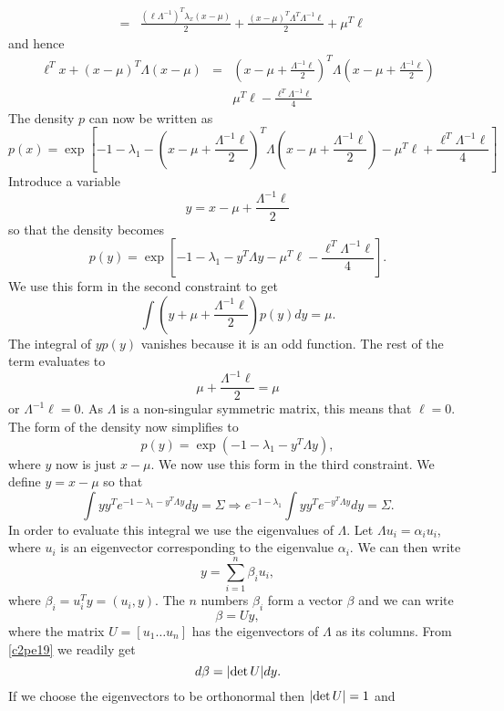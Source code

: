 \begin{enumerate}
\begin{eqnarray*}
 &=& \frac{(\ell\Lambda^{-1})^T\lambda_x(x - \mu)}{2} + \frac{(x - \mu)^T\Lambda^T\Lambda^{-1}\ell}{2} + \mu^T\ell
\end{eqnarray*}
and hence
\begin{eqnarray*}
\ell^Tx + (x-\mu)^T\Lambda(x-\mu) &=& \left(x-\mu+\frac{\Lambda^{-1}\ell}{2}\right)^T\Lambda\left(x-\mu+\frac{\Lambda^{-1}\ell}{2}\right) \\
 & & \mu^T\ell - \frac{\ell^T\Lambda^{-1}\ell}{4}
\end{eqnarray*}
The density $p$ can now be written as
\[
p(x)=\exp\left[-1-\lambda_1 - \left(x-\mu+\frac{\Lambda^{-1}\ell}{2}\right)^T\Lambda\left(x-\mu+\frac{\Lambda^{-1}\ell}{2}\right)-\mu^T\ell+\frac{\ell^T\Lambda^{-1}\ell}{4}\right]
\]
Introduce a variable 
\[
y = x - \mu + \frac{\Lambda^{-1}\ell}{2}
\]
so that the density becomes
\[
p(y) = \exp\left[-1-\lambda_1-y^T\Lambda y - \mu^T\ell - \frac{\ell^T\Lambda^{-1}\ell}{4}\right].
\]
We use this form in the second constraint to get
\[
\int\left(y + \mu + \frac{\Lambda^{-1}\ell}{2}\right)p(y)dy = \mu.
\]
The integral of $yp(y)$ vanishes because it is an odd function. The rest of the term evaluates to
\[
\mu + \frac{\Lambda^{-1}\ell}{2} = \mu
\]
or $\Lambda^{-1}\ell = 0$. As $\Lambda$ is a non-singular symmetric matrix, this means that $\ell = 0$.
The form of the density now simplifies to
\[
p(y) = \exp\left(-1 - \lambda_1 - y^T\Lambda y\right),
\]
where $y$ now is just $x - \mu$. We now use this form in the third constraint. We define 
$y = x - \mu$ so that
\begin{equation}\label{c2pe18}
\int yy^Te^{-1 - \lambda_1 - y^T\Lambda y}dy = \Sigma \Rightarrow e^{-1-\lambda_1} \int yy^T e^{-y^T\Lambda y}dy = \Sigma.
\end{equation}
In order to evaluate this integral we use the eigenvalues of $\Lambda$. Let $\Lambda u_i = \alpha_i u_i$,
where $u_i$ is an eigenvector corresponding to the eigenvalue $\alpha_i$. We can then write 
\[
y = \sum_{i=1}^n \beta_i u_i,
\]
where $\beta_i = u_i^T y = (u_i, y)$. The $n$ numbers $\beta_i$ form a vector $\beta$ and we can write
\begin{equation}\label{c2pe19}
\beta = Uy,
\end{equation}
where the matrix $U = [u_1 \ldots u_n]$ has the eigenvectors of $\Lambda$ as its columns. From \eqref{c2pe19}
we readily get 
\begin{equation}\label{c2pe20}
d\beta = \lvert\det U\rvert dy.
\end{equation}
If we choose the eigenvectors to be orthonormal then $\lvert\det U\rvert = 1$ and 

\end{enumerate}
